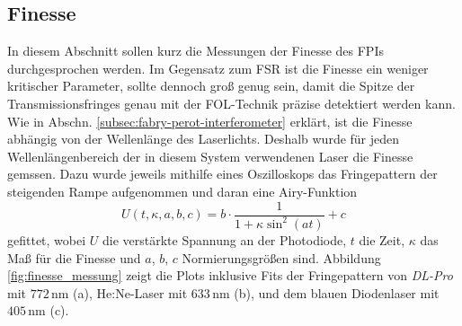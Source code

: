 \subsection{Finesse}\label{subsec:finesse}
In diesem Abschnitt sollen kurz die Messungen der Finesse des FPIs
durchgesprochen werden. Im Gegensatz zum FSR ist die Finesse ein weniger
kritischer Parameter, sollte dennoch groß genug sein, damit die Spitze der
Transmissionsfringes genau mit der FOL-Technik präzise detektiert werden
kann. Wie in Abschn. \ref{subsec:fabry-perot-interferometer} erklärt, ist
die Finesse abhängig von der Wellenlänge des Laserlichts. Deshalb wurde für jeden
Wellenlängenbereich der in diesem System verwendenen Laser die Finesse
gemssen. Dazu wurde jeweils mithilfe eines Oszilloskops das Fringepattern der
steigenden Rampe aufgenommen und daran eine Airy-Funktion
\begin{equation}\label{eq:finesse_messung_01}
	U(t,\kappa,a,b,c) = b\cdot\frac{1}{1+\kappa \sin^2{(at)}}+c
\end{equation}
gefittet, wobei $U$ die verstärkte Spannung an der Photodiode, $t$ die Zeit,
$\kappa$ das Maß für die Finesse und $a$, $b$, $c$ Normierungsgrößen sind.
Abbildung \ref{fig:finesse_messung} zeigt die Plots inklusive Fits der
Fringepattern von \textit{DL-Pro} mit $772\,$nm (a), He:Ne-Laser mit $633\,$nm (b), und dem
blauen Diodenlaser mit $405\,$nm (c).

